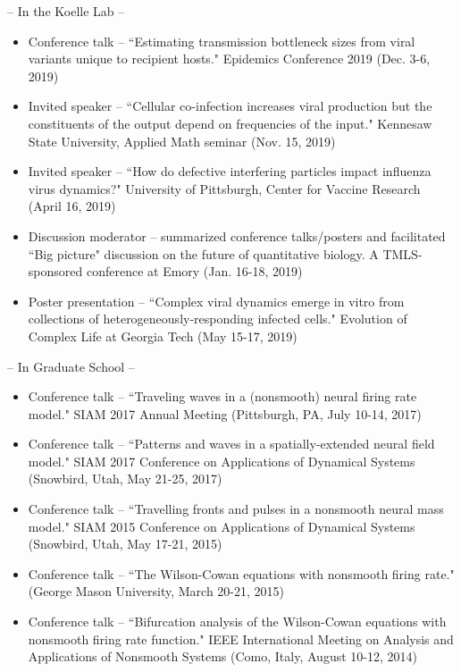 \documentclass[a4paper,10pt]{article}
\newlength{\cvcolumngapwidth}
\newlength{\cvleftcolumnwidth}
\newlength{\cvrightcolumnwidth}
\newcommand{\cvdurationstyle}[1]{{\small\cvdurationfont\textcolor{cvdurationcolor}{#1}}}
\newlength{\cvafteritemskipamount}
\newlength{\cvparskip}
\newcommand{\cvitem}[2]{
            \begin{minipage}[t]{\cvleftcolumnwidth}
                \raggedleft #1
            \end{minipage}%
            \hspace{\cvcolumngapwidth}%
            \begin{minipage}[t]{\cvrightcolumnwidth}
                \setlength{\parskip}{\cvparskip} #2
            \end{minipage}
        
            \vspace{\cvafteritemskipamount}
        }
\begin{document}
        \cvitem{
            \cvdurationstyle{}
        }{	
        	    	-- In the Koelle Lab --
        	        \begin{itemize}[leftmargin=*] 
        
            	\item Conference talk -- ``Estimating transmission bottleneck sizes from viral variants unique to recipient hosts." Epidemics Conference 2019 (Dec. 3-6, 2019)
                \item Invited speaker -- ``Cellular co-infection increases viral production but the constituents of the output depend on frequencies of the input." Kennesaw State University, Applied 	Math seminar (Nov. 15, 2019)
               	\item Invited speaker -- ``How do defective interfering particles impact influenza virus dynamics?" University of Pittsburgh, Center for Vaccine Research (April 16, 2019)
                \item Discussion moderator -- summarized conference talks/posters and facilitated ``Big picture" discussion on the future of quantitative biology. A TMLS-sponsored conference at Emory (Jan. 16-18, 2019) 
                \item Poster presentation -- ``Complex viral dynamics emerge in vitro from collections of heterogeneously-responding infected cells." Evolution of Complex Life at Georgia Tech (May 15-17, 2019) \\
            \end{itemize}
            -- In Graduate School --
            \begin{itemize}[leftmargin=*] 
            	\item Conference talk -- ``Traveling waves in a (nonsmooth) neural firing rate model." SIAM 2017 Annual Meeting (Pittsburgh, PA, July 10-14, 2017)
        	\item Conference talk -- ``Patterns and waves in a spatially-extended neural field model." SIAM 2017 Conference on Applications of Dynamical Systems \\(Snowbird, Utah, May 21-25, 2017)
            	\item Conference talk -- ``Travelling fronts and pulses in a nonsmooth neural mass model." SIAM 2015 Conference on Applications of Dynamical Systems \\(Snowbird, Utah, May 17-21, 2015)
        	\item Conference talk -- ``The Wilson-Cowan equations with nonsmooth firing rate." (George Mason University, March 20-21, 2015)
        	\item Conference talk --  ``Bifurcation analysis of the Wilson-Cowan equations with nonsmooth firing rate function." IEEE International Meeting on Analysis and Applications of Nonsmooth Systems (Como, Italy, August 10-12, 2014)
            \end{itemize}
        }
        
\end{document}
